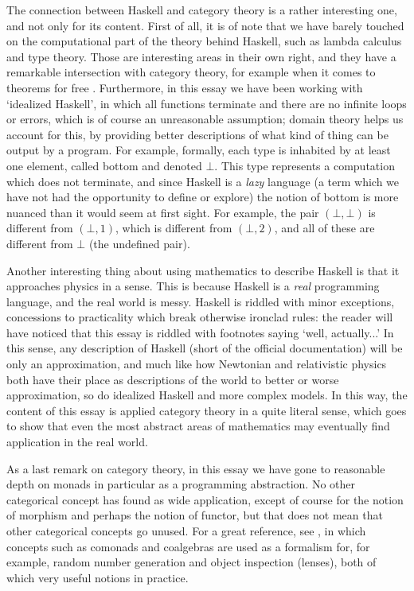\documentclass[11pt]{article}
\theoremstyle{nonumberplain}
\begin{document}
The connection between Haskell and category theory is a rather interesting one, and not only for its content. First of all, it is of note that we have barely touched on the computational part of the theory behind Haskell, such as lambda calculus and type theory. Those are interesting areas in their own right, and they have a remarkable intersection with category theory, for example when it comes to theorems for free \cite{theoremsforfree}. Furthermore, in this essay we have been working with `idealized Haskell', in which all functions terminate and there are no infinite loops or errors, which is of course an unreasonable assumption; domain theory helps us account for this, by providing better descriptions of what kind of thing can be output by a program. For example, formally, each type is inhabited by at least one element, called bottom and denoted $\bot$. This type represents a computation which does not terminate, and since Haskell is a \emph{lazy} language (a term which we have not had the opportunity to define or explore) the notion of bottom is more nuanced than it would seem at first sight. For example, the pair $(\bot, \bot)$ is different from $(\bot, 1)$, which is different from $(\bot, 2)$, and all of these are different from $\bot$ (the undefined pair).

Another interesting thing about using mathematics to describe Haskell is that it approaches physics in a sense. This is because Haskell is a \emph{real} programming language, and the real world is messy. Haskell is riddled with minor exceptions, concessions to practicality which break otherwise ironclad rules: the reader will have noticed that this essay is riddled with footnotes saying `well, actually...' In this sense, any description of Haskell (short of the official documentation) will be only an approximation, and much like how Newtonian and relativistic physics both have their place as descriptions of the world to better or worse approximation, so do idealized Haskell and more complex models. In this way, the content of this essay is applied category theory in a quite literal sense, which goes to show that even the most abstract areas of mathematics may eventually find application in the real world.

As a last remark on category theory, in this essay we have gone to reasonable depth on monads in particular as a programming abstraction. No other categorical concept has found as wide application, except of course for the notion of morphism and perhaps the notion of functor, but that does not mean that other categorical concepts go unused. For a great reference, see \cite{catforprog}, in which concepts such as comonads and coalgebras are used as a formalism for, for example, random number generation and object inspection (lenses), both of which very useful notions in practice.



\end{document}
